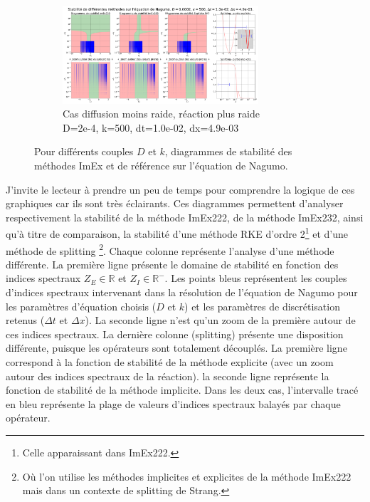 \begin{figure}[htbp]
        \begin{subfigure}{\textwidth}
            \centering
            \includegraphics[width=0.8\textwidth]{media/4_travail/2_nagumo/stabilite/STABILITE_D0.0002_k500_dt1.0e-02_dx4.9e-03.png}
            \caption{Cas diffusion moins raide, réaction plus raide\\D=2e-4, k=500, dt=1.0e-02, dx=4.9e-03}
            \label{fig:stabilite_nagumo_c}
        \end{subfigure}
        
        \caption{Pour différents couples $D$ et $k$, diagrammes de stabilité des méthodes ImEx et de référence sur l'équation de Nagumo.}
        \label{fig:stabilite_nagumo}
    \end{figure}

        J'invite le lecteur à prendre un peu de temps pour comprendre la logique de ces graphiques car ils sont très éclairants. 
        Ces diagrammes permettent d'analyser respectivement la stabilité de la méthode ImEx222, de la méthode ImEx232, 
        ainsi qu'à titre de comparaison, la stabilité d'une méthode RKE d'ordre 2\footnote{Celle apparaissant dans ImEx222.} 
        et d'une méthode de splitting
        \footnote{Où l'on utilise les méthodes implicites et explicites de la méthode ImEx222 mais dans un contexte de splitting de Strang.}.
        Chaque colonne représente l'analyse d'une méthode différente.
        La première ligne présente le domaine de stabilité en fonction des indices spectraux $Z_E \in \mathbb{R}$ et $Z_I \in \mathbb{R}^-$. 
        Les points bleus représentent les couples d'indices spectraux intervenant dans la résolution de l'équation de Nagumo 
        pour les paramètres d'équation choisis ($D$ et $k$) et les paramètres de discrétisation retenus ($\Delta t$ et $\Delta x$). 
        La seconde ligne n'est qu'un zoom de la première autour de ces indices spectraux. 
        La dernière colonne (splitting) présente une disposition différente, puisque les opérateurs sont totalement découplés.
        La première ligne correspond à la fonction de stabilité de la méthode explicite (avec un zoom autour des indices spectraux de la réaction).
        la seconde ligne représente la fonction de stabilité de la méthode implicite. 
        Dans les deux cas, l'intervalle tracé en bleu représente la plage de valeurs d'indices spectraux balayés par chaque opérateur.

